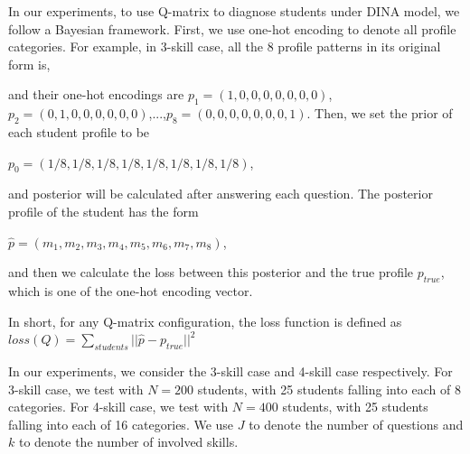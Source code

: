 \documentclass{edm_template}
\begin{document}
In our experiments, to use Q-matrix to diagnose students under DINA model, we follow a Bayesian framework. First, we use one-hot encoding to denote all profile categories. For example, in 3-skill case, all the 8 profile patterns in its original form is,

and their one-hot encodings are 
$p_1=(1,0,0,0,0,0,0,0)$, $p_2=(0,1,0,0,0,0,0,0)$,...,$p_8=(0,0,0,0,0,0,0,1)$.
Then, we set the prior of each student profile to be 

$p_0=(1/8,1/8,1/8,1/8,1/8,1/8,1/8,1/8)$, 

and posterior will be calculated after answering each question. The posterior profile of the student has the form 

$\hat{p} = (m_1,m_2,m_3,m_4,m_5,m_6,m_7,m_8)$, 

and then we calculate the loss between this posterior and the true profile $p_{true}$, which is one of the one-hot encoding vector. 

In short, for any Q-matrix configuration, the loss function is defined as
$ loss(Q) = \sum_{students} ||\hat{p} - p_{true}||^2$

In our experiments, we consider the 3-skill case and 4-skill case respectively. For 3-skill case, we test with $N=200$ students, with 25 students falling into each of 8 categories. For 4-skill case, we test with $N=400$ students, with 25 students falling into each of 16 categories. We use $J$ to denote the number of questions and $k$ to denote the number of involved skills.
\end{document}
